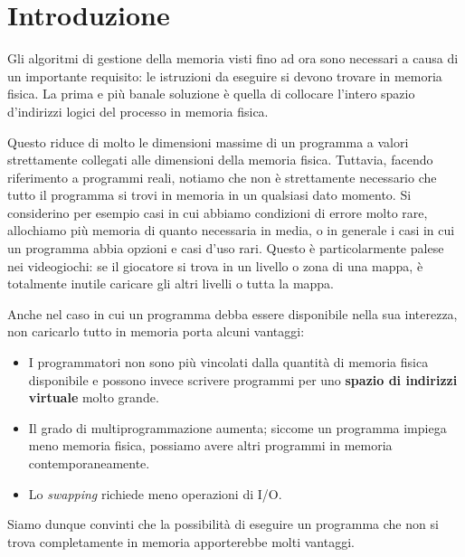 \section{Introduzione}
    Gli algoritmi di gestione della memoria visti fino ad ora sono necessari a causa di un importante requisito: le istruzioni da eseguire si devono trovare in memoria fisica. La prima e più banale soluzione è quella di collocare l'intero spazio d'indirizzi logici del processo in memoria fisica.
    
    Questo riduce di molto le dimensioni massime di un programma a valori strettamente collegati alle dimensioni della memoria fisica. Tuttavia, facendo riferimento a programmi reali, notiamo che non è strettamente necessario che tutto il programma si trovi in memoria in un qualsiasi dato momento. Si considerino per esempio casi in cui abbiamo condizioni di errore molto rare, allochiamo più memoria di quanto necessaria in media, o in generale i casi in cui un programma abbia opzioni e casi d'uso rari. Questo è particolarmente palese nei videogiochi: se il giocatore si trova in un livello o zona di una mappa, è totalmente inutile caricare gli altri livelli o tutta la mappa.
    
    Anche nel caso in cui un programma debba essere disponibile nella sua interezza, non caricarlo tutto in memoria porta alcuni vantaggi:
    \begin{itemize}
        \item I programmatori non sono più vincolati dalla quantità di memoria fisica disponibile e possono invece scrivere programmi per uno \textbf{spazio di indirizzi virtuale} molto grande.
        
        \item Il grado di multiprogrammazione aumenta; siccome un programma impiega meno memoria fisica, possiamo avere altri programmi in memoria contemporaneamente.
        
        \item Lo \textit{swapping} richiede meno operazioni di I/O.
    \end{itemize}
    
    Siamo dunque convinti che la possibilità di eseguire un programma che non si trova completamente in memoria apporterebbe molti vantaggi.
    

